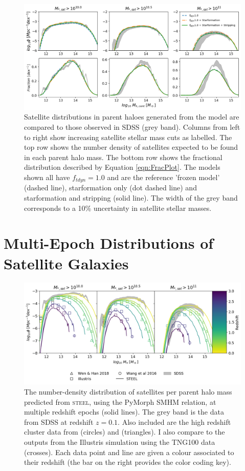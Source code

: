 \begin{figure}
	\centering
	\includegraphics[width = \linewidth]{Figures/Chapter3/Sat_Dist_SF_Strip.png}
	\caption{Satellite distributions in parent haloes generated from the model are compared to those observed in SDSS (grey band). Columns from left to right show increasing satellite stellar mass cuts as labelled. The top row shows the number density of satellites expected to be found in each parent halo mass. The bottom row shows the fractional distribution described by Equation \ref{eqn:FracPlot}. The models shown all have $f_{tdyn} = 1.0$ and are the reference 'frozen model' (dashed line), starformation only (dot dashed line) and starformation and stripping (solid line). The width of the grey band corresponds to a 10\% uncertainty in satellite stellar masses.}
	\label{fig:Sat_Dist_SF_Strip}
\end{figure}



\section{Multi-Epoch Distributions of Satellite Galaxies}

\begin{figure}[h]
	\centering
	\includegraphics[width = \linewidth]{Figures/Chapter3/HighzClusters.png}
    \caption{The number-density distribution of satellites per parent halo mass predicted from \textsc{steel}, using the PyMorph SMHM relation, at multiple redshift epochs (solid lines). The grey band is the data from SDSS at redshift $z=0.1$. Also included are the high redshift cluster data from \citet{Wang2016DiscoveryZ=2.506} (circles) and \citet{Wen2018ARedshifts} (triangles). I also compare to the outputs from the Illustris simulation using the TNG100 data (crosses). Each data point and line are given a colour associated to their redshift (the bar on the right provides the color coding key).}
	\label{fig:Sat_Dist_High_z}
\end{figure}